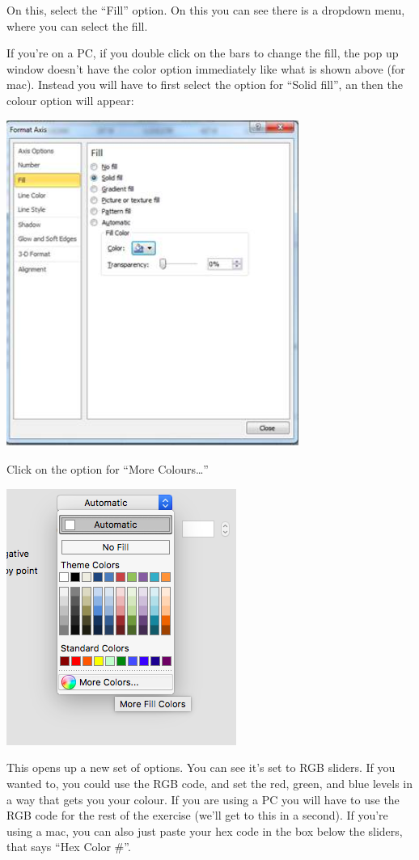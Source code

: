 \documentclass[]{book}
\theoremstyle{definition}
\theoremstyle{definition}
\theoremstyle{definition}
\theoremstyle{remark}
\begin{document}
On this, select the ``Fill'' option. On this you can see there is a
dropdown menu, where you can select the fill.

If you're on a PC, if you double click on the bars to change the fill,
the pop up window doesn't have the color option immediately like what is
shown above (for mac). Instead you will have to first select the option
for ``Solid fill'', an then the colour option will appear:

\includegraphics{imgs/pc_solid_fill.png}

Click on the option for ``More Colours\ldots{}''

\includegraphics{imgs/manual_fill_2.png}

This opens up a new set of options. You can see it's set to RGB sliders.
If you wanted to, you could use the RGB code, and set the red, green,
and blue levels in a way that gets you your colour. If you are using a
PC you will have to use the RGB code for the rest of the exercise (we'll
get to this in a second). If you're using a mac, you can also just paste
your hex code in the box below the sliders, that says ``Hex Color \#''.
\end{document}
